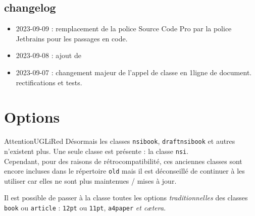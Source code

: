 \documentclass[12pt,a4paper,article]{nsi} %
\begin{document}
\maketitle

\subsection*{changelog}
\begin{itemize}
    \item 2023-09-09 : remplacement de la police Source Code Pro par la police Jetbrains pour les passages en code.
    \item 2023-09-08 : ajout de \texttt{}
        \begin{center}
        \end{center}
    \item 2023-09-07 : changement majeur de l'appel de classe en 1\ere ligne de document.\\
          rectifications et tests.
\end{itemize}


\section*{Options}

\begin{encadrecolore}{Attention}{UGLiRed}
    Désormais les classes \texttt{nsibook}, \texttt{draftnsibook} et autres n'existent plus. Une seule classe est présente : la classe \texttt{nsi}.\\

    Cependant, pour des raisons de rétrocompatibilité, ces anciennes classes sont encore incluses dans le répertoire \texttt{old} mais il est déconseillé de continuer à les utiliser car elles ne sont plus maintenues / mises à jour.
\end{encadrecolore}


Il est possible de passer à la classe toutes les options \textit{traditionnelles} des classes \texttt{book} ou \texttt{article} : \texttt{12pt} ou \texttt{11pt}, \texttt{a4paper} \textit{et cætera}.\\
\end{document}
